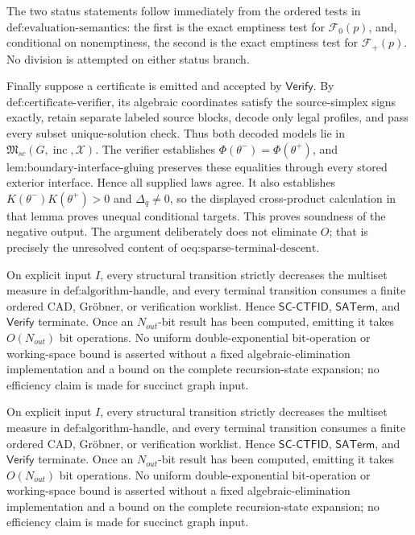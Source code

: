 The two status statements follow immediately from the ordered tests in \(\text{def:evaluation-semantics}\): the first is the exact emptiness test for \(\mathcal F_0(p)\), and, conditional on nonemptiness, the second is the exact emptiness test for \(\mathcal F_+(p)\).  No division is attempted on either status branch.

Finally suppose a certificate is emitted and accepted by \(\mathsf{Verify}\).  By \(\text{def:certificate-verifier}\), its algebraic coordinates satisfy the source-simplex signs exactly, retain separate labeled source blocks, decode only legal profiles, and pass every subset unique-solution check.  Thus both decoded models lie in \(\mathfrak M_{sc}(G,\operatorname{inc},\mathcal X)\).  The verifier establishes \(\Phi(\theta^-)=\Phi(\theta^+)\), and \(\text{lem:boundary-interface-gluing}\) preserves these equalities through every stored exterior interface.  Hence all supplied laws agree.  It also establishes \(K(\theta^-)K(\theta^+)>0\) and \(\Delta_q\ne0\), so the displayed cross-product calculation in that lemma proves unequal conditional targets.  This proves soundness of the negative output.  The argument deliberately does not eliminate \(O\); that is precisely the unresolved content of \(\text{oeq:sparse-terminal-descent}\).

On explicit input \(I\), every structural transition strictly decreases the multiset measure in \(\text{def:algorithm-handle}\), and every terminal transition consumes a finite ordered CAD, Gr\"obner, or verification worklist.  Hence \(\mathsf{SC\mbox{-}CTFID}\), \(\mathsf{SATerm}\), and \(\mathsf{Verify}\) terminate.  Once an \(N_{out}\)-bit result has been computed, emitting it takes \(O(N_{out})\) bit operations.  No uniform double-exponential bit-operation or working-space bound is asserted without a fixed algebraic-elimination implementation and a bound on the complete recursion-state expansion; no efficiency claim is made for succinct graph input.

On explicit input \(I\), every structural transition strictly decreases the multiset measure in \(\text{def:algorithm-handle}\), and every terminal transition consumes a finite ordered CAD, Gr\"obner, or verification worklist.  Hence \(\mathsf{SC\mbox{-}CTFID}\), \(\mathsf{SATerm}\), and \(\mathsf{Verify}\) terminate.  Once an \(N_{out}\)-bit result has been computed, emitting it takes \(O(N_{out})\) bit operations.  No uniform double-exponential bit-operation or working-space bound is asserted without a fixed algebraic-elimination implementation and a bound on the complete recursion-state expansion; no efficiency claim is made for succinct graph input.

